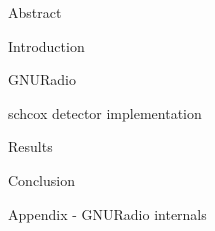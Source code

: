 




\usepackage{antropy_en}


  

  \begin{topchapter}{Abstract}
    
  \end{topchapter}

  \begin{topchapter}{Introduction}
    
  \end{topchapter}

  \begin{topchapter}{GNURadio}
    
  \end{topchapter}

  \begin{topchapter}{\acrlong{schcox} detector implementation}
    
  \end{topchapter}

  \begin{topchapter}{Results}
    
  \end{topchapter}

  \begin{topchapter}{Conclusion}
    
  \end{topchapter}

  \begin{topchapter}{Appendix - GNURadio internals}
    
  \end{topchapter}

  \newpage
  \printglossaries
  \printbibliography

  \vfill
  

